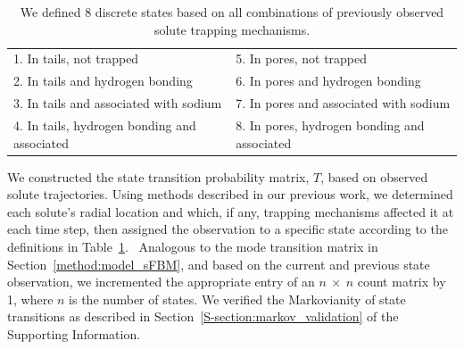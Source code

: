 \documentclass[aps,pre,preprint,groupedaddress]{revtex4-2}
\begin{document}
  \begin{table}[!htb]
	  \centering
	  \begin{tabular}{|l|l|}
	  \hline
	  1. In tails, not trapped                     & 5. In pores, not trapped                     \\
	  2. In tails and hydrogen bonding             & 6. In pores and hydrogen bonding             \\
	  3. In tails and associated with sodium       & 7. In pores and associated with sodium       \\
	  4. In tails, hydrogen bonding and associated & 8. In pores, hydrogen bonding and associated \\
	  \hline
	  \end{tabular}
	  \caption{We defined 8 discrete states based on all combinations of previously observed solute
	  trapping mechanisms.}\label{table:states}  
  \end{table}
  
  We constructed the state transition probability matrix, $T$, based on observed 
  solute trajectories. Using methods described in our previous work, we determined 
  each solute's radial location and which, if any, trapping mechanisms affected 
  it at each time step, then assigned the observation to a specific state according
  to the definitions in Table~\ref{table:states}.~\cite{coscia_chemically_2019}
  Analogous to the mode transition matrix in Section~\ref{method:model_sFBM}, and 
  based on the current and previous state observation, we incremented the appropriate
  entry of an $n~\times~n$ count matrix by 1, where $n$ is the number of states. We
  verified the Markovianity of state transitions as described in 
  Section~\ref{S-section:markov_validation} of the Supporting Information.
  
  
\end{document}
